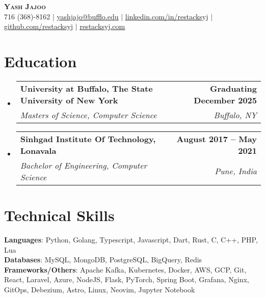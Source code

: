 \documentclass[letterpaper,11pt]{article}
\makeatletter
\newcommand{\resumeSubheading}[4]{
  \vspace{-2pt}\item
    \begin{tabular*}{0.97\textwidth}[t]{l@{\extracolsep{\fill}}r}
        \textbf{#1} & \textbf{#2} \\
      \textit{\small#3} & \textit{\small #4} \\
    \end{tabular*}\vspace{-7pt}
}
\newcommand{\resumeSubHeadingListStart}{\begin{itemize}[leftmargin=0.15in, label={}]}
\newcommand{\resumeSubHeadingListEnd}{\end{itemize}}
\makeatother
\begin{document}

\begin{center}
    \textbf{\Huge \scshape Yash Jajoo} \\ \vspace{1pt}
    \small 716 (368)-8162 $|$ \href{mailto:yashjajo@buffalo.edu}{\underline{yashjajo@bufflo.edu}} $|$ 
    \href{https://linkedin.com/in/restacksyj}{\underline{linkedin.com/in/restacksyj}} $|$
    \href{https://github.com/restacksyj}{\underline{github.com/restacksyj}} $|$
    \href{https://restacksyj.com}{\underline{restacksyj.com}} 
\end{center}


\section{Education}
  \resumeSubHeadingListStart
    \resumeSubheading
      {University at Buffalo, The State University of New York}{Graduating December 2025}
      {Masters of Science, Computer Science}{Buffalo, NY}
    \resumeSubheading
      {Sinhgad Institute Of Technology, Lonavala}{August 2017 -- May 2021}
      {Bachelor of Engineering, Computer Science}{Pune, India}
  \resumeSubHeadingListEnd


\section{Technical Skills}
 \begin{itemize}[leftmargin=0.15in, label={}]
    \small{\item{
            \textbf{Languages}{: Python, Golang, Typescript, Javascript, Dart, Rust, C, C++, PHP, Lua } \\ \textbf{Databases}{: MySQL, MongoDB, PostgreSQL, BigQuery, Redis} \\ \textbf{Frameworks/Others}{: Apache Kafka, Kubernetes, Docker, AWS, GCP, Git, React, Laravel, Azure, NodeJS, Flask, PyTorch, Spring Boot, Grafana, Nginx, GitOps, Debezium, Astro, Linux, Neovim, Jupyter Notebook }}}
 \end{itemize}
\end{document}
